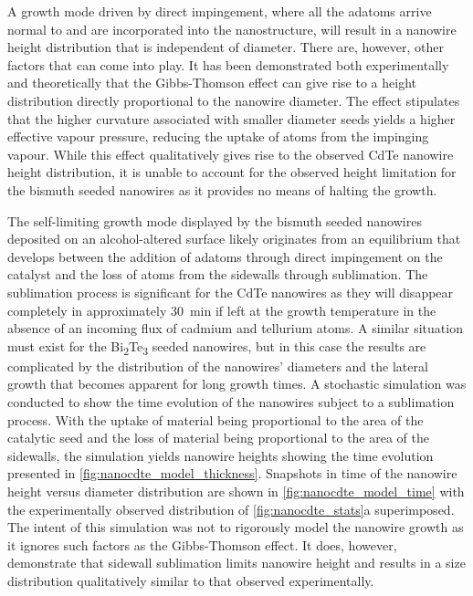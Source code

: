 A growth mode driven by direct impingement, where all the adatoms arrive normal to and are incorporated into the nanostructure, will result in a nanowire height distribution that is independent of diameter.
There are, however, other factors that can come into play.
It has been demonstrated both experimentally\cite{Schubert2004a,Wu2002} and theoretically\cite{Kashchiev2006,Chen2006} that the Gibbs-Thomson effect can give rise to a height distribution directly proportional to the nanowire diameter.
The effect stipulates that the higher curvature associated with smaller diameter seeds yields a higher effective vapour pressure, reducing the uptake of atoms from the impinging vapour.
While this effect qualitatively gives rise to the observed CdTe nanowire height distribution, it is unable to account for the observed height limitation for the bismuth seeded nanowires as it provides no means of halting the growth.

The self-limiting growth mode displayed by the bismuth seeded nanowires deposited on an alcohol-altered surface likely originates from an equilibrium that develops between the addition of adatoms through direct impingement on the catalyst and the loss of atoms from the sidewalls through sublimation.
The sublimation process is significant for the CdTe nanowires as they will disappear completely in approximately 30~min if left at the growth temperature in the absence of an incoming flux of cadmium and tellurium atoms.
A similar situation must exist for the Bi\textsubscript{2}Te\textsubscript{3} seeded nanowires, but in this case the results are complicated by the distribution of the nanowires' diameters and the lateral growth that becomes apparent for long growth times.
A stochastic simulation was conducted to show the time evolution of the nanowires subject to a sublimation process.
With the uptake of material being proportional to the area of the catalytic seed and the loss of material being proportional to the area of the sidewalls, the simulation yields nanowire heights showing the time evolution presented in \cref{fig:nanocdte_model_thickness}.
Snapshots in time of the nanowire height versus diameter distribution are shown in \cref{fig:nanocdte_model_time} with the experimentally observed distribution of \cref{fig:nanocdte_stats}a superimposed.
The intent of this simulation was not to rigorously model the nanowire growth as it ignores such factors as the Gibbs-Thomson effect.
It does, however, demonstrate that sidewall sublimation limits nanowire height and results in a size distribution qualitatively similar to that observed experimentally.

